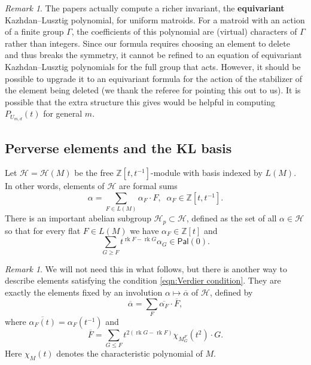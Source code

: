\documentclass[12pt,reqno]{amsart}
\theoremstyle{definition}
\theoremstyle{remark}
\newtheorem{remark}[theorem]{Remark}
\newcommand{\rk}{\operatorname{rk}}
\newcommand{\Z}{{\mathbb{Z}}}
\renewcommand{\(}{\left(}
\renewcommand{\)}{\right)}
\newcommand{\<}{\left<}
\renewcommand{\>}{\right>}
\newcommand{\cal}{\mathcal}
\newcommand{\cH}{{\cal H}}
\newcommand{\Pal}{\mathsf{Pal}}
\begin{document}
\begin{remark}
The papers \cite{PWY,GPY,GLXYZ} actually compute a richer invariant, the \textbf{equivariant} Kazhdan--Lusztig polynomial, for uniform matroids.  For a matroid with an action of a finite group $\Gamma$, the coefficients of this polynomial are (virtual) characters of $\Gamma$ rather than integers. 
Since our formula requires choosing an element to delete and thus breaks the symmetry, it cannot be refined to an equation of equivariant Kazhdan--Lusztig polynomials for the full group that acts.  However, it should be possible to upgrade it to an equivariant formula for the action of the stabilizer of the element being deleted (we thank the referee for pointing this out to us).  It is possible that the extra structure this gives would be helpful in computing $P_{U_{m,d}}(t)$ for general $m$.
\end{remark}  


\subsection{Perverse elements and the KL basis}

Let
$\cH = \cH(M) $ be the free $\Z[t,t^{-1}]$-module with basis indexed by $L(M)$.  In other words, elements of $\cH$ are formal sums
\[\alpha = \sum_{F \in L(M)} \alpha_F \cdot F, \;\; \alpha_F \in \Z[t,t^{-1}].\]
There is an important abelian subgroup
$\cH_p \subset \cH$, defined as the set of
all $\alpha\in \cH$ so that for every flat $F\in L(M)$ we have $\alpha_F \in \Z[t]$ and 
\begin{equation}\label{eqn:Verdier condition}
\sum_{G \ge F} t^{\rk F-\rk G}\alpha_G \in \Pal(0).
\end{equation}


\begin{remark}
We will not need this in what follows, but there is another way to describe elements satisfying the condition \eqref{eqn:Verdier condition}.  They are exactly the elements fixed by an involution $\alpha \mapsto \overline{\alpha}$ of $\cH$, defined by 
\[\overline{\alpha} = \sum_F \overline{\alpha_F}\cdot \overline{F},\]
where $\overline{\alpha_F(t)} = \alpha_F(t^{-1})$ and
\[\overline{F} = \sum_{G \le F} t^{2(\rk G-\rk F)}\chi_{M^F_G}(t^2) \cdot G.\]
Here $\chi_{M}(t)$ denotes the characteristic polynomial of $M$.
\end{remark}
\end{document}
